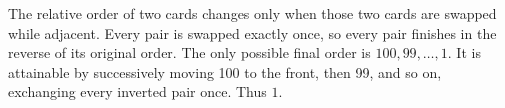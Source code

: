 The relative order of two cards changes only when those two cards are swapped while adjacent. Every pair is swapped exactly once, so every pair finishes in the reverse of its original order. The only possible final order is $100,99,\ldots,1$. It is attainable by successively moving 100 to the front, then 99, and so on, exchanging every inverted pair once. Thus $\boxed1$.
